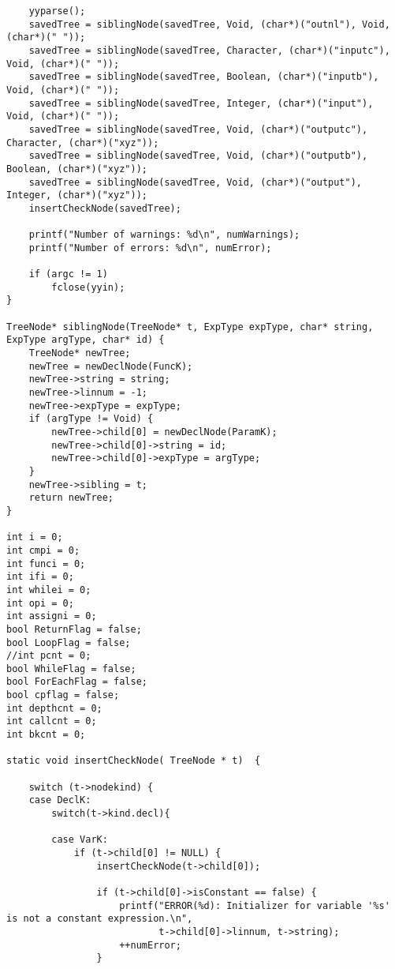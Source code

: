 \documentclass[12pt]{book}
\begin{document}
\begin{lstlisting}
    yyparse();
    savedTree = siblingNode(savedTree, Void, (char*)("outnl"), Void, (char*)(" "));
    savedTree = siblingNode(savedTree, Character, (char*)("inputc"), Void, (char*)(" "));
    savedTree = siblingNode(savedTree, Boolean, (char*)("inputb"), Void, (char*)(" "));
    savedTree = siblingNode(savedTree, Integer, (char*)("input"), Void, (char*)(" "));
    savedTree = siblingNode(savedTree, Void, (char*)("outputc"), Character, (char*)("xyz"));
    savedTree = siblingNode(savedTree, Void, (char*)("outputb"), Boolean, (char*)("xyz"));
    savedTree = siblingNode(savedTree, Void, (char*)("output"), Integer, (char*)("xyz"));
    insertCheckNode(savedTree);  

    printf("Number of warnings: %d\n", numWarnings);
    printf("Number of errors: %d\n", numError);

    if (argc != 1)
        fclose(yyin);
}

TreeNode* siblingNode(TreeNode* t, ExpType expType, char* string, ExpType argType, char* id) {
    TreeNode* newTree; 
    newTree = newDeclNode(FuncK);
    newTree->string = string; 
    newTree->linnum = -1;
    newTree->expType = expType;
    if (argType != Void) {
        newTree->child[0] = newDeclNode(ParamK);
        newTree->child[0]->string = id;
        newTree->child[0]->expType = argType;
    }
    newTree->sibling = t;
    return newTree;
}

int i = 0;
int cmpi = 0;
int funci = 0;
int ifi = 0;
int whilei = 0;
int opi = 0;
int assigni = 0;
bool ReturnFlag = false;
bool LoopFlag = false;
//int pcnt = 0;
bool WhileFlag = false;
bool ForEachFlag = false;
bool cpflag = false;
int depthcnt = 0;
int callcnt = 0;
int bkcnt = 0;

static void insertCheckNode( TreeNode * t)  {

    switch (t->nodekind) {
    case DeclK:  
        switch(t->kind.decl){

        case VarK:
            if (t->child[0] != NULL) {
                insertCheckNode(t->child[0]);

                if (t->child[0]->isConstant == false) {
                    printf("ERROR(%d): Initializer for variable '%s' is not a constant expression.\n", 
                           t->child[0]->linnum, t->string);
                    ++numError;
                }


\end{lstlisting}
\end{document}
